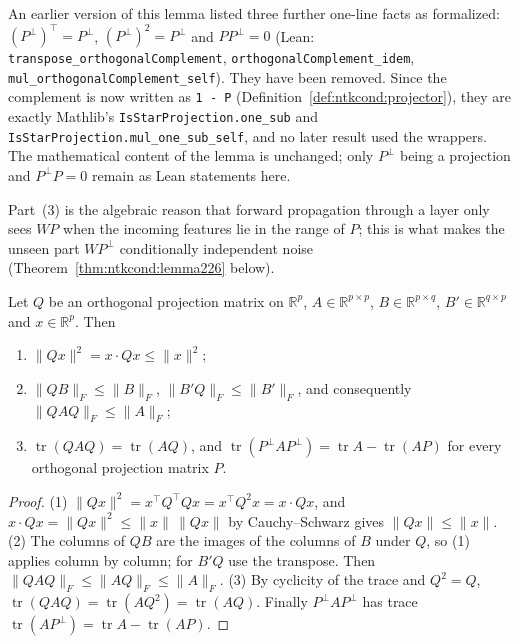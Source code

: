 \begin{remark}\label{rmk:ntkcond:projectorAlgebraChange}
An earlier version of this lemma listed three further one-line facts as formalized: $(P^\perp)^\top=P^\perp$, $(P^\perp)^2=P^\perp$ and $PP^\perp=0$ (Lean: \texttt{transpose\_orthogonalComplement}, \texttt{orthogonalComplement\_idem}, \texttt{mul\_orthogonalComplement\_self}). They have been removed. Since the complement is now written as \texttt{1 - P} (Definition~\ref{def:ntkcond:projector}), they are exactly Mathlib's \texttt{IsStarProjection.one\_sub} and \texttt{IsStarProjection.mul\_one\_sub\_self}, and no later result used the wrappers. The mathematical content of the lemma is unchanged; only $P^\perp$ being a projection and $P^\perp P=0$ remain as Lean statements here.
\end{remark}


Part~(3) is the algebraic reason that forward propagation through a layer only sees $WP$ when the incoming features lie in the range of $P$; this is what makes the unseen part $WP^\perp$ conditionally independent noise (Theorem~\ref{thm:ntkcond:lemma226} below).

\begin{lemma}\label{lem:ntkcond:projectorNorms}
  \leanok
Let $Q$ be an orthogonal projection matrix on $\mathbb R^p$, $A\in\mathbb R^{p\times p}$, $B\in\mathbb R^{p\times q}$, $B'\in\mathbb R^{q\times p}$ and $x\in\mathbb R^p$. Then
\begin{enumerate}
  \item $\|Qx\|^2=x\cdot Qx\le\|x\|^2$;
  \item $\|QB\|_F\le\|B\|_F$, $\|B'Q\|_F\le\|B'\|_F$, and consequently $\|QAQ\|_F\le\|A\|_F$;
  \item $\operatorname{tr}(QAQ)=\operatorname{tr}(AQ)$, and $\operatorname{tr}(P^\perp AP^\perp)=\operatorname{tr}A-\operatorname{tr}(AP)$ for every orthogonal projection matrix $P$.
\end{enumerate}
\end{lemma}

\begin{proof}
  \leanok
(1) $\|Qx\|^2=x^\top Q^\top Qx=x^\top Q^2x=x\cdot Qx$, and $x\cdot Qx=\|Qx\|^2\le\|x\|\,\|Qx\|$ by Cauchy--Schwarz gives $\|Qx\|\le\|x\|$. (2) The columns of $QB$ are the images of the columns of $B$ under $Q$, so (1) applies column by column; for $B'Q$ use the transpose. Then $\|QAQ\|_F\le\|AQ\|_F\le\|A\|_F$. (3) By cyclicity of the trace and $Q^2=Q$, $\operatorname{tr}(QAQ)=\operatorname{tr}(AQ^2)=\operatorname{tr}(AQ)$. Finally $P^\perp AP^\perp$ has trace $\operatorname{tr}(AP^\perp)=\operatorname{tr}A-\operatorname{tr}(AP)$.
\end{proof}

